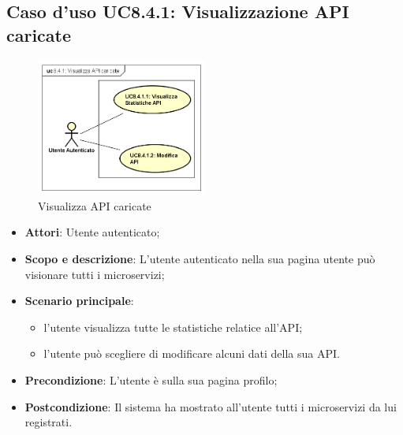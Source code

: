 \documentclass[12pt,a4paper,titlepage]{article}
\begin{document}
	\subsection{Caso d'uso UC8.4.1: Visualizzazione API caricate}
	\label{UC8.4.1}
	\begin{figure}[H]
		\centering
		\includegraphics[width=0.5\textwidth]{UseCase/APICaricate}
		\caption{Visualizza API caricate}
	\end{figure}
	\begin{itemize}
		\item \textbf{Attori}: Utente autenticato;
		\item \textbf{Scopo e descrizione}: L'utente autenticato nella sua pagina utente può visionare tutti i microservizi;
		\item \textbf{Scenario principale}:
			\begin{itemize}
				\item l'utente visualizza tutte le statistiche relatice all'API;
				\item l'utente può scegliere di modificare alcuni dati della sua API.
			\end{itemize}
		\item \textbf{Precondizione}: L'utente è sulla sua pagina profilo;
		\item \textbf{Postcondizione}: Il sistema ha mostrato all'utente tutti i microservizi da lui registrati.
	\end{itemize}
\end{document}
